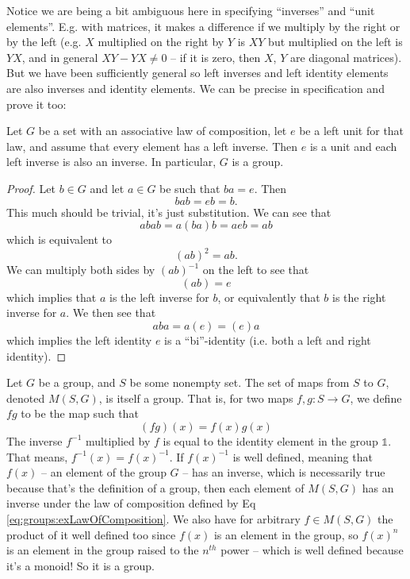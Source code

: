 Notice we are being a bit ambiguous here in specifying
``inverses'' and ``unit elements''. E.g. with matrices, it makes
a difference if we multiply by the right or by the left
(e.g. $X$ multiplied on the right by $Y$ is $XY$ but
multiplied on the left is $YX$, and in general $XY-YX\neq0$
-- if it is zero, then $X$, $Y$ are diagonal matrices). But
we have been sufficiently general so left inverses and left
identity elements are also inverses and identity
elements. We can be precise in specification and prove it
too:
\begin{prop}
Let $G$ be a set with an associative law of composition, let
$e$ be a left unit for that law, and assume that every
element has a left inverse. Then $e$ is a unit and each left
inverse is also an inverse. In particular, $G$ is a group.
\end{prop}
\begin{proof}
Let $b\in G$ and let $a\in G$ be such that $ba=e$. Then
\begin{equation}
bab = eb = b.
\end{equation} 
This much should be trivial, it's just substitution. We can
see that
\begin{equation}
abab = a(ba)b = aeb = ab
\end{equation}
which is equivalent to
\begin{equation}
(ab)^2 = ab.
\end{equation}
We can multiply both sides by $(ab)^{-1}$ on the left to see
that
\begin{equation}
(ab) = e
\end{equation}
which implies that $a$ is the left inverse for $b$, or
equivalently that $b$ is the right inverse for $a$. We then
see that
\begin{equation}
aba = a(e) = (e)a
\end{equation}
which implies the left identity $e$ is a ``bi''-identity
(i.e. both a left and right identity).
\end{proof}
\begin{ex}
Let $G$ be a group, and $S$ be some nonempty set. The set of
maps from $S$ to $G$, denoted $M(S,G)$, is itself a
group. That is, for two maps $f,g:S\to G$, we define $fg$ to
be the map such that
\begin{equation}\label{eq:groups:exLawOfComposition}
(fg)(x) = f(x)g(x)
\end{equation}
The inverse $f^{-1}$ multiplied by $f$ is equal to the
identity element in the group $\mathbb{1}$. That means,
$f^{-1}(x)=f(x)^{-1}$. If $f(x)^{-1}$ is well defined,
meaning that $f(x)$ -- an element of the group $G$ -- has an
inverse, which is necessarily true because that's the
definition of a group, then each element of $M(S,G)$ has an
inverse under the law of composition defined by Eq
\eqref{eq:groups:exLawOfComposition}. We also have for
arbitrary $f\in M(S,G)$ the product of it well defined too
since $f(x)$ is an element in the group, so $f(x)^n$ is an
element in the group raised to the $n^{th}$ power -- which
is well defined because it's a monoid! So it is a group.\qef
\end{ex}
